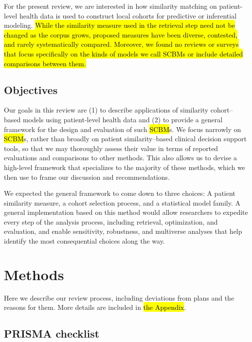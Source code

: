 \documentclass[sn-mathphys,Numbered,pdflatex]{sn-jnl}
\theoremstyle{remark}
\theoremstyle{definition}
\begin{document}
For the present review, we are interested in how similarity matching on
patient-level health data is used to construct local cohorts for
predictive or inferential
modeling.\hl{ While the similarity measure used in the retrieval step need not be changed as the corpus grows, proposed measures have been diverse, contested, and rarely systematically compared. Moreover, we found no reviews or surveys that focus specifically on the kinds of models we call SCBMs or include detailed comparisons between them.}

\subsection{Objectives}\label{objectives}

Our goals in this review are (1) to describe applications of similarity
cohort--based models using patient-level health data and (2) to provide
a general framework for the design and evaluation of such \hl{SCBM}s. We
focus narrowly on \hl{SCBM}s, rather than broadly on patient
similarity--based clinical decision support tools, so that we may
thoroughly assess their value in terms of reported evaluations and
comparisons to other methods. This also allows us to devise a high-level
framework that specializes to the majority of these methods, which we
then use to frame our discussion and recommendations.

We expected the general framework to come down to three choices: A
patient similarity measure, a cohort selection process, and a
statistical model family. A general implementation based on this method
would allow researchers to expedite every step of the analysis process,
including retrieval, optimization, and evaluation, and enable
sensitivity, robustness, and multiverse analyses that help identify the
most consequential choices along the way.

\section{Methods}\label{methods}

Here we describe our review process, including deviations from plans and
the reasons for them. More details are included in \hl{the Appendix}.

\subsection{PRISMA checklist}\label{prisma-checklist}
\end{document}
